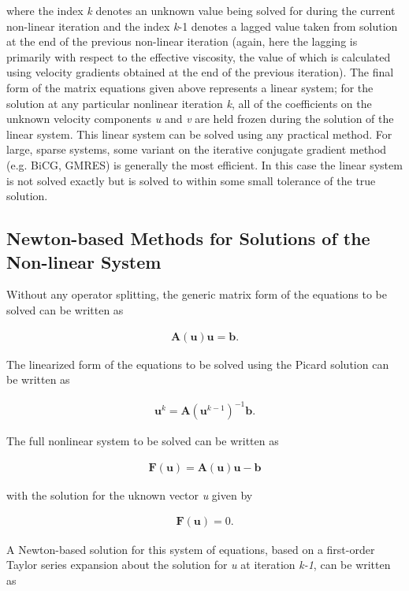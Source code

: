 where the index \textit{k} denotes an unknown value being solved for during the current non-linear iteration and the index \textit{k}-1 denotes a lagged value taken from solution at the end of the previous non-linear iteration (again, here the lagging is primarily with respect to the effective viscosity, the value of which is calculated using velocity gradients obtained at the end of the previous iteration). The final form of the matrix equations given above represents a linear system; for the solution at any particular nonlinear iteration \textit{k}, all of the coefficients on the unknown velocity components \textit{u} and \textit{v} are held frozen during the solution of the linear system. This linear system can be solved using any practical method. For large, sparse systems, some variant on the iterative conjugate gradient method (e.g. BiCG, GMRES) is generally the most efficient. In this case the linear system is not solved exactly but is solved to within some small tolerance of the true solution.

\subsection{Newton-based Methods for Solutions of the Non-linear System}
Without any operator splitting, the generic matrix form of the equations to be solved can be written as

\begin{align*}
\mathbf{A}(\mathbf{u})\mathbf{u}=\mathbf{b}.
\end{align*}

The linearized form of the equations to be solved using the Picard solution can be written as

\begin{align*}
\mathbf{u}^{k}=\mathbf{A}(\mathbf{u}^{k-1})^{-1}\mathbf{b}.
\end{align*}

The full nonlinear system to be solved can be written as

\begin{align*}
\mathbf{F}(\mathbf{u})=\mathbf{A}(\mathbf{u})\mathbf{u}-\mathbf{b}
\end{align*}

with the solution for the uknown vector \textit{u} given by 

\begin{align*}
\mathbf{F}(\mathbf{u})=0.
\end{align*}

A Newton-based solution for this system of equations, based on a first-order Taylor series expansion about the solution for \textit{u} at iteration \textit{k-1}, can be written as


